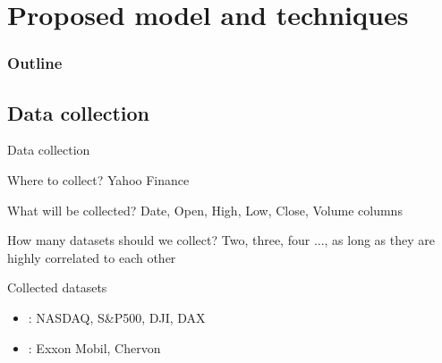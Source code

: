 \documentclass[compress, mathserif, fleqn, 10pt]{beamer}
\begin{document}
	\section{Proposed model and techniques}
	\begin{frame}
		\frametitle{Outline}
		\tableofcontents[currentsection]
	\end{frame}
	
	
	
	\subsection{Data collection}
	\begin{frame}{Data collection}
		\begin{exampleblock}{Where to collect?}
			Yahoo Finance
		\end{exampleblock}
		\begin{exampleblock}{What will be collected?}
			Date, Open, High, Low, Close, Volume columns
		\end{exampleblock}
		\begin{exampleblock}{How many datasets should we collect?}
			Two, three, four ..., as long as they are highly correlated to each other
		\end{exampleblock}
		\begin{block}{Collected datasets}
			\begin{itemize}
				\item {}: NASDAQ, S\&P500, DJI, DAX
				
				\item {}: Exxon Mobil, Chervon
			\end{itemize}
		\end{block}
	\end{frame}
	
\end{document}
